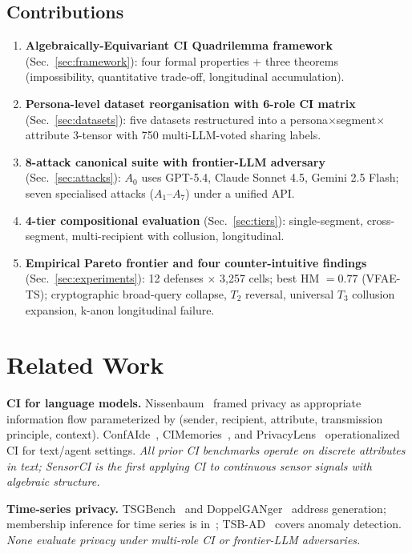 \documentclass{article}
\theoremstyle{remark}
\begin{document}
\subsection{Contributions}
\begin{enumerate}
\item \textbf{Algebraically-Equivariant CI Quadrilemma framework} (Sec.~\ref{sec:framework}): four formal properties + three theorems (impossibility, quantitative trade-off, longitudinal accumulation).
\item \textbf{Persona-level dataset reorganisation with 6-role CI matrix} (Sec.~\ref{sec:datasets}): five datasets restructured into a persona$\times$segment$\times$attribute 3-tensor with 750 multi-LLM-voted sharing labels.
\item \textbf{8-attack canonical suite with frontier-LLM adversary} (Sec.~\ref{sec:attacks}): $A_0$ uses GPT-5.4, Claude Sonnet 4.5, Gemini 2.5 Flash; seven specialised attacks ($A_1$--$A_7$) under a unified API.
\item \textbf{4-tier compositional evaluation} (Sec.~\ref{sec:tiers}): single-segment, cross-segment, multi-recipient with collusion, longitudinal.
\item \textbf{Empirical Pareto frontier and four counter-intuitive findings} (Sec.~\ref{sec:experiments}): 12 defenses $\times$ 3{,}257 cells; best HM $= 0.77$ (VFAE-TS); cryptographic broad-query collapse, $T_2$ reversal, universal $T_3$ collusion expansion, k-anon longitudinal failure.
\end{enumerate}

\section{Related Work}
\label{sec:related}

\textbf{CI for language models.} Nissenbaum~\cite{nissenbaum2004} framed privacy as appropriate information flow parameterized by (sender, recipient, attribute, transmission principle, context). ConfAIde~\cite{confaide}, CIMemories~\cite{cimemories}, and PrivacyLens~\cite{privacylens} operationalized CI for text/agent settings. \emph{All prior CI benchmarks operate on discrete attributes in text; SensorCI is the first applying CI to continuous sensor signals with algebraic structure.}

\textbf{Time-series privacy.} TSGBench~\cite{tsgbench} and DoppelGANger~\cite{doppelganger} address generation; membership inference for time series is in~\cite{mia_ts}; TSB-AD~\cite{tsbad} covers anomaly detection. \emph{None evaluate privacy under multi-role CI or frontier-LLM adversaries.}
\end{document}
